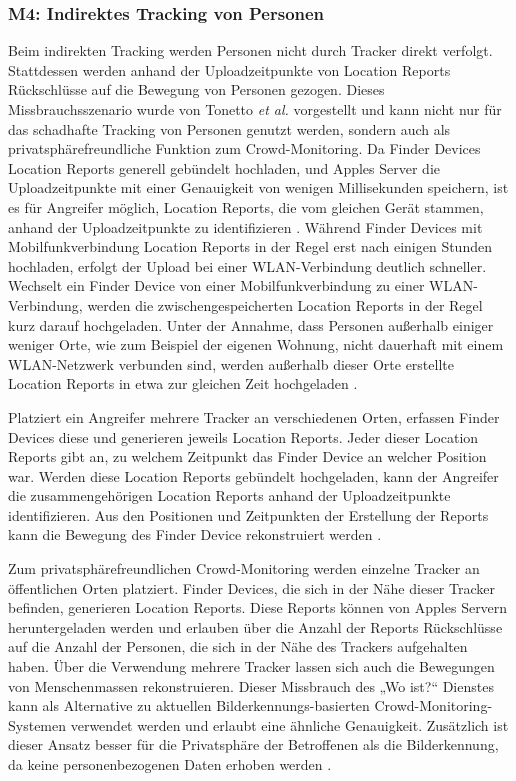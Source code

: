 \subsubsection[M4]{M4: Indirektes Tracking von Personen}
\label{missbrauch:4}
Beim indirekten Tracking werden Personen nicht durch Tracker direkt verfolgt.
Stattdessen werden anhand der Uploadzeitpunkte von Location Reports Rückschlüsse auf die Bewegung von Personen gezogen.
Dieses Missbrauchsszenario wurde von Tonetto \textit{et al.} \cite{Tonetto_FindMy} vorgestellt und kann nicht nur für das schadhafte Tracking von Personen genutzt werden, sondern auch als privatsphärefreundliche Funktion zum Crowd-Monitoring.
Da Finder Devices Location Reports generell gebündelt hochladen, und Apples Server die Uploadzeitpunkte mit einer Genauigkeit von wenigen Millisekunden speichern, ist es für Angreifer möglich, Location Reports, die vom gleichen Gerät stammen, anhand der Uploadzeitpunkte zu identifizieren \cite{Tonetto_FindMy}.
Während Finder Devices mit Mobilfunkverbindung Location Reports in der Regel erst nach einigen Stunden hochladen, erfolgt der Upload bei einer WLAN-Verbindung deutlich schneller.
Wechselt ein Finder Device von einer Mobilfunkverbindung zu einer WLAN-Verbindung, werden die zwischengespeicherten Location Reports in der Regel kurz darauf hochgeladen.
Unter der Annahme, dass Personen außerhalb einiger weniger Orte, wie zum Beispiel der eigenen Wohnung, nicht dauerhaft mit einem WLAN-Netzwerk verbunden sind, werden außerhalb dieser Orte erstellte Location Reports in etwa zur gleichen Zeit hochgeladen \cite{Tonetto_FindMy}.

Platziert ein Angreifer mehrere Tracker an verschiedenen Orten, erfassen Finder Devices diese und generieren jeweils Location Reports.
Jeder dieser Location Reports gibt an, zu welchem Zeitpunkt das Finder Device an welcher Position war.
Werden diese Location Reports gebündelt hochgeladen, kann der Angreifer die zusammengehörigen Location Reports anhand der Uploadzeitpunkte identifizieren.
Aus den Positionen und Zeitpunkten der Erstellung der Reports kann die Bewegung des Finder Device rekonstruiert werden \cite{Tonetto_FindMy}.


Zum privatsphärefreundlichen Crowd-Monitoring werden einzelne Tracker an öffentlichen Orten platziert.
Finder Devices, die sich in der Nähe dieser Tracker befinden, generieren Location Reports.
Diese Reports können von Apples Servern heruntergeladen werden und erlauben über die Anzahl der Reports Rückschlüsse auf die Anzahl der Personen, die sich in der Nähe des Trackers aufgehalten haben.
Über die Verwendung mehrere Tracker lassen sich auch die Bewegungen von Menschenmassen rekonstruieren.
Dieser Missbrauch des „Wo ist?“ Dienstes kann als Alternative zu aktuellen Bilderkennungs-basierten Crowd-Monitoring-Systemen verwendet werden und erlaubt eine ähnliche Genauigkeit.
Zusätzlich ist dieser Ansatz besser für die Privatsphäre der Betroffenen als die Bilderkennung, da keine personenbezogenen Daten erhoben werden \cite{Tonetto_FindMy}.


